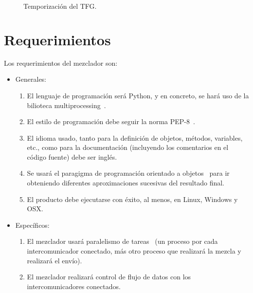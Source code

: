 \documentclass[titlepage, 12pt, a4paper, oneside]{article}
\begin{document}
\begin{figure}
  \begin{center}
  \end{center}
  \caption{Temporización del TFG.\label{fig:temporizacion}}
\end{figure}

\section{Requerimientos}
\label{sec:requerimientos}
Los requerimientos del mezclador son:

\begin{itemize}
\item Generales:
  \begin{enumerate}
  \item El lenguaje de programación será Python, y en concreto, se
    hará uso de la bilioteca multiprocessing~\cite{multiprocessing}.
  \item El estilo de programación debe seguir la norma
    PEP-8~\cite{PEP8}.
  \item El idioma usado, tanto para la definición de objetos, métodos,
    variables, etc., como para la documentación (incluyendo los
    comentarios en el código fuente) debe ser inglés.
  \item Se usará el paragigma de programación orientado a
    objetos~\cite{schach2008object} para ir obteniendo diferentes
    aproximaciones sucesivas del resultado final.
  \item El producto debe ejecutarse con éxito, al menos, en Linux,
    Windows y OSX.
  \end{enumerate}
\item Específicos:
  \begin{enumerate}
  \item El mezclador usará paralelismo de
    tareas~\cite{pacheco2011introduction} (un proceso por cada
    intercomunicador conectado, más otro proceso que realizará la
    mezcla y realizará el envío).
  \item El mezclador realizará control de flujo de datos con los
    intercomunicadores conectados.
  \end{enumerate}
\end{itemize}
\end{document}
